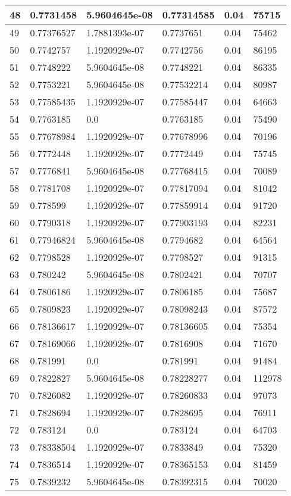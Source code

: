 \begin{longtable}{|l|l|l|l|l|l|}
48 & 0.7731458 & 5.9604645e-08 & 0.77314585 & 0.04 & 75715 \\ \hline 
49 & 0.77376527 & 1.7881393e-07 & 0.7737651 & 0.04 & 75462 \\ \hline 
50 & 0.7742757 & 1.1920929e-07 & 0.7742756 & 0.04 & 86195 \\ \hline 
51 & 0.7748222 & 5.9604645e-08 & 0.7748221 & 0.04 & 86335 \\ \hline 
52 & 0.7753221 & 5.9604645e-08 & 0.77532214 & 0.04 & 80987 \\ \hline 
53 & 0.77585435 & 1.1920929e-07 & 0.77585447 & 0.04 & 64663 \\ \hline 
54 & 0.7763185 & 0.0 & 0.7763185 & 0.04 & 75490 \\ \hline 
55 & 0.77678984 & 1.1920929e-07 & 0.77678996 & 0.04 & 70196 \\ \hline 
56 & 0.7772448 & 1.1920929e-07 & 0.7772449 & 0.04 & 75745 \\ \hline 
57 & 0.7776841 & 5.9604645e-08 & 0.77768415 & 0.04 & 70089 \\ \hline 
58 & 0.7781708 & 1.1920929e-07 & 0.77817094 & 0.04 & 81042 \\ \hline 
59 & 0.778599 & 1.1920929e-07 & 0.77859914 & 0.04 & 91720 \\ \hline 
60 & 0.7790318 & 1.1920929e-07 & 0.77903193 & 0.04 & 82231 \\ \hline 
61 & 0.77946824 & 5.9604645e-08 & 0.7794682 & 0.04 & 64564 \\ \hline 
62 & 0.7798528 & 1.1920929e-07 & 0.7798527 & 0.04 & 91315 \\ \hline 
63 & 0.780242 & 5.9604645e-08 & 0.7802421 & 0.04 & 70707 \\ \hline 
64 & 0.7806186 & 1.1920929e-07 & 0.7806185 & 0.04 & 75687 \\ \hline 
65 & 0.7809823 & 1.1920929e-07 & 0.78098243 & 0.04 & 87572 \\ \hline 
66 & 0.78136617 & 1.1920929e-07 & 0.78136605 & 0.04 & 75354 \\ \hline 
67 & 0.78169066 & 1.1920929e-07 & 0.7816908 & 0.04 & 71670 \\ \hline 
68 & 0.781991 & 0.0 & 0.781991 & 0.04 & 91484 \\ \hline 
69 & 0.7822827 & 5.9604645e-08 & 0.78228277 & 0.04 & 112978 \\ \hline 
70 & 0.7826082 & 1.1920929e-07 & 0.78260833 & 0.04 & 97073 \\ \hline 
71 & 0.7828694 & 1.1920929e-07 & 0.7828695 & 0.04 & 76911 \\ \hline 
72 & 0.783124 & 0.0 & 0.783124 & 0.04 & 64703 \\ \hline 
73 & 0.78338504 & 1.1920929e-07 & 0.7833849 & 0.04 & 75320 \\ \hline 
74 & 0.7836514 & 1.1920929e-07 & 0.78365153 & 0.04 & 81459 \\ \hline 
75 & 0.7839232 & 5.9604645e-08 & 0.78392315 & 0.04 & 70020 \\ \hline 
\end{longtable}